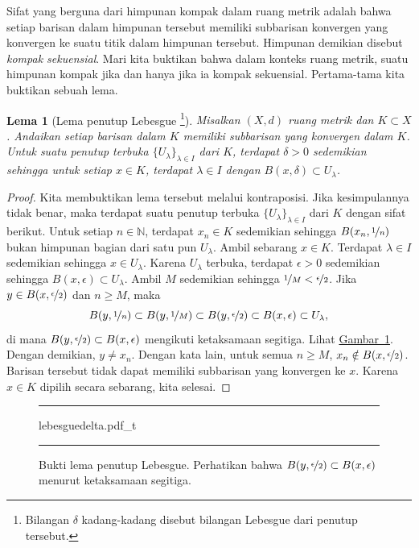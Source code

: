 \documentclass[12pt,openany]{book}
\newcommand{\N}{{\mathbb{N}}}
\newcommand{\myindex}[1]{#1\index{#1}}
\theoremstyle{plain}
\newtheorem{lemma}[thm]{Lema}
\theoremstyle{remark}
\theoremstyle{definition}
\newenvironment{myfig}{%
\begin{figure}[h!t]
\noindent\rule{\textwidth}{0.5pt}\vspace{12pt}\par\centering}%
{\par\noindent\rule{\textwidth}{0.5pt}
\end{figure}}
\theoremstyle{exercise}
\theoremstyle{example}
\newcommand{\figureref}[1]{\hyperref[#1]{Gambar~\ref*{#1}}}
\begin{document}
Sifat yang berguna dari himpunan kompak dalam ruang metrik adalah bahwa setiap
barisan dalam himpunan tersebut memiliki subbarisan konvergen yang konvergen
ke suatu titik dalam himpunan tersebut.
Himpunan demikian disebut
\emph{\myindex{kompak sekuensial}}.
Mari kita buktikan bahwa dalam
konteks ruang metrik, suatu himpunan kompak jika dan hanya jika ia kompak
sekuensial.
Pertama-tama kita buktikan sebuah lema.

\begin{lemma}[Lema penutup Lebesgue%
\footnote{Bilangan $\delta$ kadang-kadang disebut
\myindex{bilangan Lebesgue} dari penutup tersebut.}]\label{ms:lebesgue}
Misalkan $(X,d)$ ruang metrik dan $K \subset X$. Andaikan
setiap barisan dalam $K$ memiliki subbarisan yang konvergen dalam $K$. Untuk
suatu penutup terbuka $\{ U_\lambda \}_{\lambda \in I}$ dari $K$, terdapat
$\delta > 0$ sedemikian sehingga untuk setiap $x \in K$, terdapat $\lambda \in I$
dengan $B(x,\delta) \subset U_\lambda$.
\end{lemma}

\begin{proof}
Kita membuktikan lema tersebut melalui kontraposisi.
Jika kesimpulannya tidak benar, maka
terdapat
suatu penutup terbuka $\{ U_\lambda \}_{\lambda \in I}$ dari $K$ dengan
sifat berikut.
Untuk setiap $n \in \N$, terdapat $x_n \in K$ sedemikian sehingga
$B(x_n,\nicefrac{1}{n})$ bukan himpunan bagian dari satu pun $U_\lambda$.
Ambil sebarang $x \in K$. Terdapat
$\lambda \in I$ sedemikian sehingga $x \in U_\lambda$. Karena $U_\lambda$ terbuka,
terdapat $\epsilon > 0$
sedemikian sehingga $B(x,\epsilon) \subset U_\lambda$. Ambil $M$ sedemikian sehingga
$\nicefrac{1}{M} < \nicefrac{\epsilon}{2}$. Jika $y \in
B(x,\nicefrac{\epsilon}{2})$ dan $n \geq M$, maka
\begin{equation*}
B(y,\nicefrac{1}{n}) \subset
B(y,\nicefrac{1}{M}) \subset
B(y,\nicefrac{\epsilon}{2}) \subset B(x,\epsilon)
\subset U_\lambda ,
\end{equation*}
di mana
$B(y,\nicefrac{\epsilon}{2}) \subset B(x,\epsilon)$
mengikuti ketaksamaan segitiga.
Lihat \figureref{fig:lebesguedelta}.
Dengan demikian, $y \neq x_n$.
Dengan kata lain, untuk semua $n \geq M$, $x_n \notin B(x,\nicefrac{\epsilon}{2})$.
Barisan tersebut tidak dapat memiliki subbarisan yang konvergen ke $x$. Karena $x \in K$ dipilih
secara sebarang, kita selesai.
\end{proof}

\begin{myfig}
{lebesguedelta.pdf_t}
\caption{Bukti lema penutup Lebesgue.
Perhatikan bahwa $B(y,\nicefrac{\epsilon}{2}) \subset
B(x,\epsilon)$ menurut ketaksamaan segitiga.\label{fig:lebesguedelta}}
\end{myfig}
\end{document}
